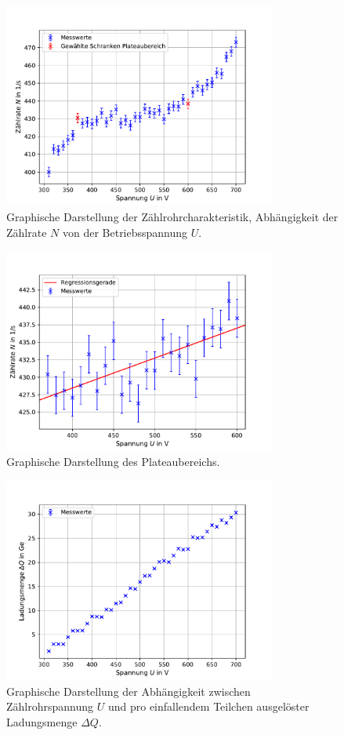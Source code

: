 \newpage

\begin{figure}
  \centering
  \includegraphics[width = 0.8\textwidth]{../Messdaten/plots/all_counts.pdf}
  \caption{Graphische Darstellung der Zählrohrcharakteristik, Abhängigkeit der Zählrate $N$ von der Betriebsspannung $U$.}
  \label{fig: zählrate_ges}
\end{figure}
\begin{figure}
  \centering
  \includegraphics[width = 0.8\textwidth]{../Messdaten/plots/plateau.pdf}
  \caption{Graphische Darstellung des Plateaubereichs.}
  \label{fig: plateau}
\end{figure}
\begin{figure}
  \centering
  \includegraphics[width = 0.8\textwidth]{../Messdaten/plots/ladung.pdf}
  \caption{Graphische Darstellung der Abhängigkeit zwischen Zählrohrspannung $U$ und pro einfallendem Teilchen ausgelöster Ladungsmenge $\Delta Q$.}
  \label{fig: ladung}
\end{figure}
